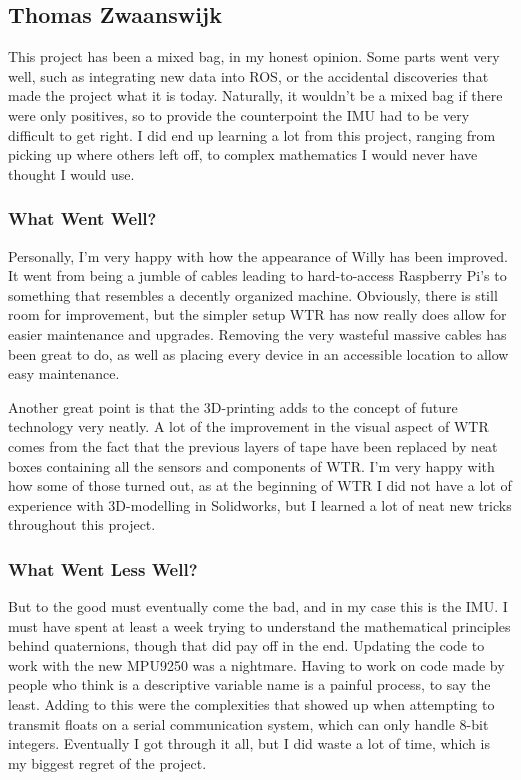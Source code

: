 \subsection{Thomas Zwaanswijk}
This project has been a mixed bag, in my honest opinion.
Some parts went very well, such as integrating new data into ROS, or the accidental discoveries that made the project what it is today.
Naturally, it wouldn't be a mixed bag if there were only positives, so to provide the counterpoint the IMU had to be very difficult to get right.
I did end up learning a lot from this project, ranging from picking up where others left off, to complex mathematics I would never have thought I would use.

\subsubsection{What Went Well?}
Personally, I'm very happy with how the appearance of Willy has been improved.
It went from being a jumble of cables leading to hard-to-access Raspberry Pi's to something that resembles a decently organized machine.
Obviously, there is still room for improvement, but the simpler setup WTR has now really does allow for easier maintenance and upgrades.
Removing the very wasteful massive cables has been great to do, as well as placing every device in an accessible location to allow easy maintenance.

Another great point is that the 3D-printing adds to the concept of future technology very neatly.
A lot of the improvement in the visual aspect of WTR comes from the fact that the previous layers of tape have been replaced by neat boxes containing all the sensors and components of WTR.
I'm very happy with how some of those turned out, as at the beginning of WTR I did not have a lot of experience with 3D-modelling in Solidworks, but I learned a lot of neat new tricks throughout this project.

\subsubsection{What Went Less Well?}
But to the good must eventually come the bad, and in my case this is the IMU.
I must have spent at least a week trying to understand the mathematical principles behind quaternions, though that did pay off in the end.
Updating the code to work with the new MPU9250 was a nightmare.
Having to work on code made by people who think  is a descriptive variable name is a painful process, to say the least.
Adding to this were the complexities that showed up when attempting to transmit floats on a serial communication system, which can only handle 8-bit integers.
Eventually I got through it all, but I did waste a lot of time, which is my biggest regret of the project.

